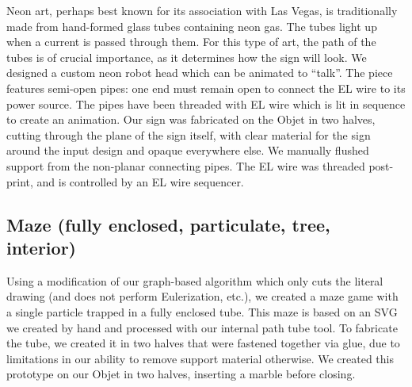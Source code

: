 Neon art, perhaps best known for its association with Las Vegas, is traditionally made from hand-formed glass tubes containing neon gas.  The tubes light up when a current is passed through them.  For this type of art, the path of the tubes is of crucial importance, as it determines how the sign will look.  We designed a custom neon robot head which can be animated to ``talk''.  The piece features semi-open pipes: one end must remain open to connect the EL wire to its power source.  The pipes have been threaded with EL wire which is lit in sequence to create an animation.  Our sign was fabricated on the Objet in two halves, cutting through the plane of the sign itself, with clear material for the sign around the input design and opaque everywhere else.  We manually flushed support from the non-planar connecting pipes.  The EL wire was threaded post-print, and is controlled by an EL wire sequencer.

\subsection{Maze (fully enclosed, particulate, tree, interior)}

Using a modification of our graph-based algorithm which only cuts the literal drawing (and does not perform Eulerization, etc.), we created a maze game with a single particle trapped in a fully enclosed tube.  This maze is based on an SVG we created by hand and processed with our internal path tube tool.  To fabricate the tube, we created it in two halves that were fastened together via glue, due to limitations in our ability to remove support material otherwise.     We created this prototype on our Objet in two halves, inserting a marble before closing.
